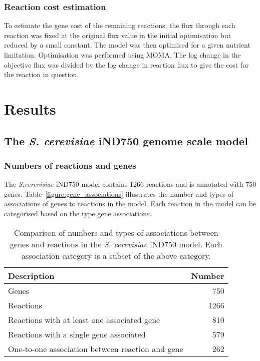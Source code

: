 \subsubsection{Reaction cost estimation}

To estimate the gene cost of the remaining reactions, the flux through each reaction was fixed at the original flux value in the initial optimisation but reduced by a small constant. The model was then optimised for a given nutrient limitation. Optimisation was performed using MOMA. The log change in the objective flux was divided by the log change in reaction flux to give the cost for the reaction in question.


\clearpage

\section{Results}

\subsection{The \emph{S. cerevisiae} iND750 genome scale model}

\subsubsection{Numbers of reactions and genes}

The \emph{S.cerevisiae} iND750 model contains 1266 reactions and is annotated with 750 genes. Table~\vref{figure:gene_associations} illustrates the number and types of associations of genes to reactions in the model. Each reaction in the model can be categorised based on the type gene associations.

\begin{table}
  \centering
  \begin{tabular}{l r}
                                                                   \toprule
    Description                                      & Number   \\ \midrule
    Genes                                            & 750      \\
    Reactions                                        & 1266     \\
    Reactions with at least one associated gene      & 810      \\
    Reactions with a single gene associated          & 579      \\
    One-to-one association between reaction and gene & 262      \\ \bottomrule
  \end{tabular}
  \caption[Gene associations in the \emph{S. cerevisiae} iND750 model]{Comparison of numbers and types of associations between genes and reactions in the \emph{S. cerevisiae} iND750 model. Each association category is a subset of the above category.}
  \label{figure:gene_associations}
\end{table}

